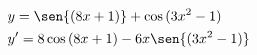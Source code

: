 \begin{ex}
\begin{align}
&y=\sen{(8x+1)}+\cos{(3x^2-1)}\nonumber\\
&y'=8\cos{(8x+1)}-6x\sen{(3x^2-1)}\nonumber
\end{align}
\end{ex}